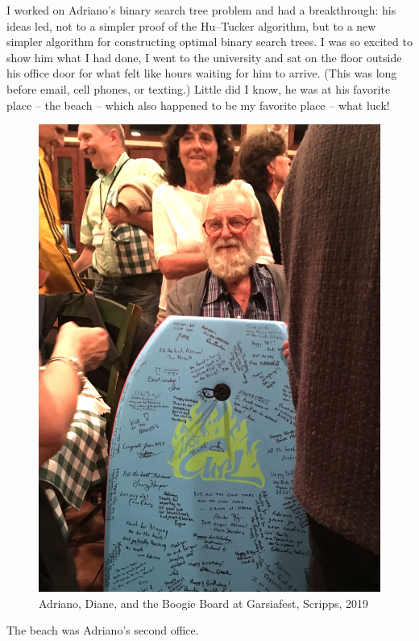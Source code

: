 \documentclass{notices}
\begin{document}
I worked on Adriano's binary search tree problem and had a breakthrough:  his ideas led, not to a simpler proof of the Hu--Tucker algorithm, but  to a  new simpler algorithm for constructing optimal binary search trees. 
I was so excited to show him what I had done, I went to the university and sat on the floor outside his office door for what felt like hours waiting  for him to arrive. (This was long before email, cell phones, or texting.)  Little did I know, he was at his favorite place -- the beach -- which also happened to be my favorite place -- what luck!   

\begin{figure}
    \centering
    \includegraphics[width=0.95\linewidth]{Michelle_Wachs/IMG_4082.jpeg} 
 {\footnotesize Adriano, Diane, and the Boogie Board at Garsiafest, Scripps, 2019}
    \end{figure}
The beach was Adriano's second office. 
\end{document}
